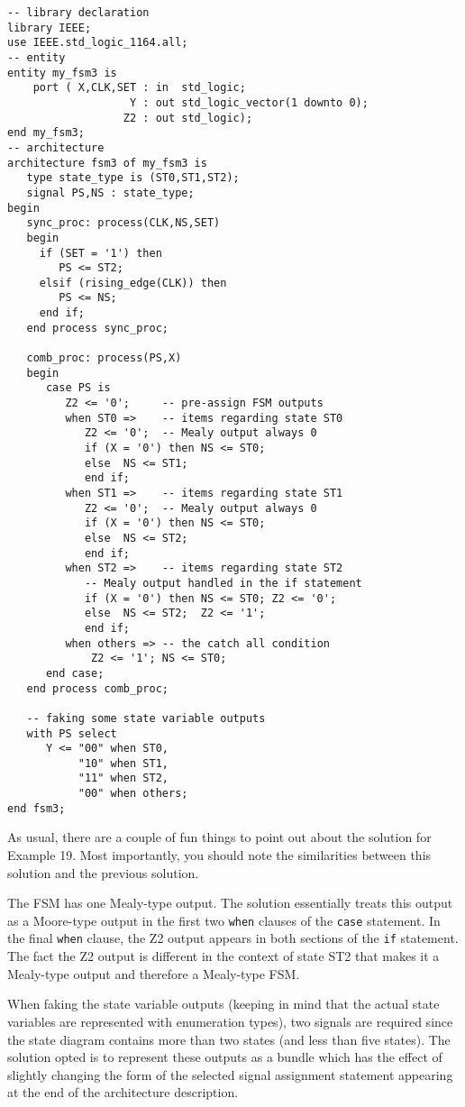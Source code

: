 \noindent
\begin{minipage}{0.99\linewidth}
\begin{lstlisting}[label=exe_19_code, caption=Solution to Example 19.]
-- library declaration
library IEEE;
use IEEE.std_logic_1164.all;
-- entity
entity my_fsm3 is 
    port ( X,CLK,SET : in  std_logic; 
                   Y : out std_logic_vector(1 downto 0); 
                  Z2 : out std_logic); 
end my_fsm3;
-- architecture
architecture fsm3 of my_fsm3 is
   type state_type is (ST0,ST1,ST2); 
   signal PS,NS : state_type; 
begin
   sync_proc: process(CLK,NS,SET)
   begin
     if (SET = '1') then 
        PS <= ST2; 
     elsif (rising_edge(CLK)) then 
        PS <= NS; 
     end if; 
   end process sync_proc; 

   comb_proc: process(PS,X)
   begin
      case PS is 
         Z2 <= '0';     -- pre-assign FSM outputs
         when ST0 =>    -- items regarding state ST0
            Z2 <= '0';  -- Mealy output always 0
            if (X = '0') then NS <= ST0;  
            else  NS <= ST1; 
            end if; 
         when ST1 =>    -- items regarding state ST1
            Z2 <= '0';  -- Mealy output always 0
            if (X = '0') then NS <= ST0; 
            else  NS <= ST2; 
            end if; 
         when ST2 =>    -- items regarding state ST2
            -- Mealy output handled in the if statement
            if (X = '0') then NS <= ST0; Z2 <= '0'; 
            else  NS <= ST2;  Z2 <= '1';     
            end if; 
         when others => -- the catch all condition
             Z2 <= '1'; NS <= ST0; 
      end case; 
   end process comb_proc; 
 
   -- faking some state variable outputs
   with PS select
      Y <= "00" when ST0, 
           "10" when ST1, 
           "11" when ST2, 
           "00" when others; 
end fsm3;
\end{lstlisting}
\end{minipage}

As usual, there are a couple of fun things to point out about the solution for Example 19. Most importantly, you should note the similarities between this solution and the previous solution. 

\begin{my_list}
\item The FSM has one Mealy-type output. The solution essentially treats this output as a Moore-type output in the first two \texttt{when} clauses of the \texttt{case} statement. In the final \texttt{when} clause, the Z2 output appears in both sections of the \texttt{if} statement. The fact the Z2 output is different in the context of state ST2 that makes it a Mealy-type output and therefore a Mealy-type FSM. 

\item When faking the state variable outputs (keeping in mind that the actual state variables are represented with enumeration types), two signals are required since the state diagram contains more than two states (and less than five states). The solution opted is to represent these outputs as a bundle which has the effect of slightly changing the form of the selected signal assignment statement appearing at the end of the architecture description. 
\end{my_list}

